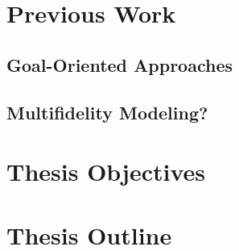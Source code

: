 \section{Previous Work}  %
\subsection{Goal-Oriented Approaches}
\subsection{Multifidelity Modeling?}


\section{Thesis Objectives}  %

\section{Thesis Outline}  %


